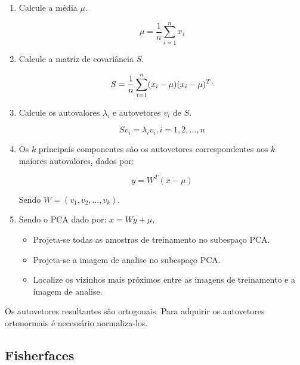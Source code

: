\begin{enumerate}
    \item Calcule a média $\mu$.

    \begin{equation*}
        \mu = \frac{1}{n} \sum_{i=1}^{n} x_{i}
    \end{equation*}
    \item Calcule a matriz de covariância $S$.

    \begin{equation*}
        S = \frac{1}{n} \sum_{i=1}^{n} (x_{i} - \mu) (x_{i} - \mu)^{T}`
    \end{equation*}

    \item Calcule os autovalores $\lambda_{i}$ e autovetores $v_{i}$ de $S$.

    \begin{equation*}
        S v_{i} = \lambda_{i} v_{i}, i=1,2,\ldots,n
    \end{equation*}

    \item Os $k$ principais componentes são os autovetores correspondentes aos $k$ maiores autovalores, dados por:

    \begin{equation*}
        y = W^{T} (x - \mu)
    \end{equation*}

    Sendo $W = (v_{1}, v_{2}, \ldots, v_{k})$.

    \item Sendo o PCA dado por: $x = W y + \mu$,
    \begin{itemize}
        \item Projeta-se todas as amostras de treinamento no subespaço PCA.
        \item Projeta-se a imagem de analise no subespaço PCA.
        \item Localize os vizinhos mais próximos entre as imagens de treinamento e a imagem de analise.
    \end{itemize}
\end{enumerate}

Os autovetores resultantes são ortogonais. Para adquirir os autovetores ortonormais é necessário normaliza-los.


\subsection*{Fisherfaces} %
\label{sub:fisherfaces}

